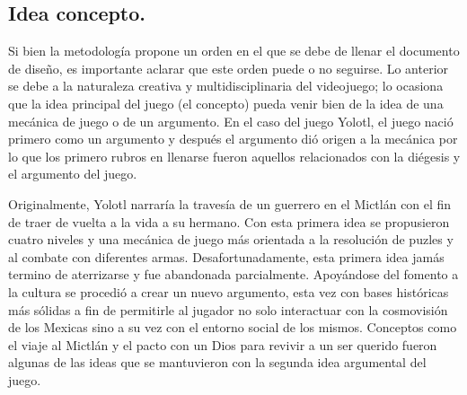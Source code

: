 \subsection{Idea concepto.}
Si bien la metodología propone un orden en el que se debe de llenar el documento de diseño, es importante aclarar que este orden puede o no seguirse. Lo anterior se debe a la naturaleza creativa y multidisciplinaria del videojuego; lo ocasiona que la idea principal del juego (el concepto) pueda venir bien de la idea de una mecánica de juego o de un argumento. En el caso del juego Yolotl, el juego nació primero como un argumento y después el argumento dió origen a la mecánica por lo que los primero rubros en llenarse fueron aquellos relacionados con la diégesis y el argumento del juego. 
\\
\par
Originalmente, Yolotl narraría la travesía de un guerrero en el Mictlán con el fin de traer de vuelta a la vida a su hermano. Con esta primera idea se propusieron cuatro niveles y una mecánica de juego más orientada a la resolución de puzles y al combate con diferentes armas. Desafortunadamente, esta primera idea jamás termino de aterrizarse y fue abandonada parcialmente. Apoyándose del fomento a la cultura se procedió a crear un nuevo argumento, esta vez con bases históricas más sólidas a fin de permitirle al jugador no solo interactuar con la cosmovisión de los Mexicas sino a su vez con el entorno social de los mismos. Conceptos como el viaje al Mictlán y el pacto con un Dios para revivir a un ser querido fueron algunas de las ideas que se mantuvieron con la segunda idea argumental del juego. 

